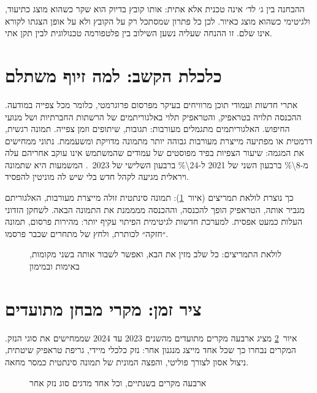 ההבחנה בין ג׳ לד׳ אינה טכנית אלא אתית: אותו קובץ בדיוק הוא שקר כשהוא מוצג כתיעוד, ולגיטימי כשהוא מוצג כאיור. לכן כל פתרון שמסתכל רק על הקובץ ולא על אופן הצגתו לקורא אינו שלם. זו ההנחה שעליה נשען השילוב בין פלטפורמה טכנולוגית לבין תקן אתי.

\section{כלכלת הקשב: למה זיוף משתלם}
אתרי חדשות ועמודי תוכן מרוויחים בעיקר מפרסום פרוגרמטי, כלומר מכל צפייה במודעה. ההכנסה תלויה בטראפיק, והטראפיק תלוי באלגוריתמים של הרשתות החברתיות ושל מנועי החיפוש. האלגוריתמים מתגמלים מעורבות: תגובות, שיתופים וזמן צפייה. תמונה רגשית, דרמטית או מפתיעה מייצרת מעורבות גבוהה יותר מתמונה מדויקת ומשעממת. נתוני  ממחישים את המגמה: שיעור הצפיות בפיד מפוסטים של עמודים שהמשתמש אינו עוקב אחריהם עלה מ-\num{8\%} ברבעון השני של \num{2021} ל-\num{24\%} ברבעון השלישי של \num{2023}~\cite{diresta2024}. המשמעות היא שתמונה ויראלית מגיעה לקהל חדש בלי שיש לה מוניטין להפסיד.

כך נוצרת לולאת תמריצים (איור~\ref{fig:loop}): תמונה סינתטית זולה מייצרת מעורבות, האלגוריתם מגביר אותה, הטראפיק הופך להכנסה, וההכנסה ממממנת את התמונה הבאה. לשחקן הזדוני העלות כמעט אפסית. למערכת חדשות לגיטימית הפיתוי עקיף יותר: מהירות פרסום, תמונה ״חזקה״ לכותרת, ולחץ של מתחרים שכבר פרסמו.

\begin{figure}[!htb]
\begin{ltrdiagram}

\end{ltrdiagram}
\caption{לולאת התמריצים: כל שלב מזין את הבא, ואפשר לשבור אותה בשני מקומות, באימות ובמימון}\label{fig:loop}
\end{figure}

\section{ציר זמן: מקרי מבחן מתועדים}
איור~\ref{fig:timeline} מציג ארבעה מקרים מתועדים מהשנים \num{2023} עד \num{2024} שממחישים את סוגי הנזק. המקרים נבחרו כך שכל אחד מייצג מנגנון אחר: נזק כלכלי מיידי, גריפת טראפיק שיטתית, ניצול אסון לצורך פוליטי, והפצה המונית של תמונה סינתטית כמסר מחאה.

\begin{figure}[!htb]
\begin{ltrdiagram}

\end{ltrdiagram}
\caption{ארבעה מקרים בשנתיים, וכל אחד מדגים סוג נזק אחר~\cite{npr2023,diresta2024,time2024,verify2024}}\label{fig:timeline}
\end{figure}

